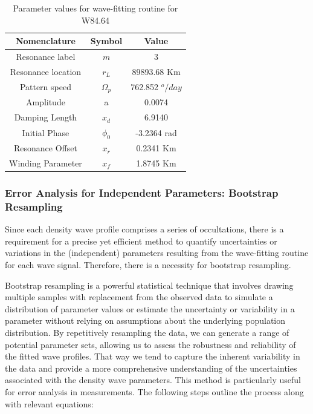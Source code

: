 \documentclass{article}
\begin{document}
\begin{table}
\centering
\begin{tabular}{|c|c|c|}
\hline
\textbf{Nomenclature} & \textbf{Symbol} & \textbf{Value} \\
\hline
Resonance label & $m$ & 3 \\
\hline
Resonance location & $r_{L}$ & 89893.68 Km \\
\hline
Pattern speed & $\Omega_{p}$ & 762.852 $^{o}/day$ \\
\hline
Amplitude & a & 0.0074 \\
\hline
Damping Length & $x_{d}$ & 6.9140 \\
\hline
Initial Phase & $\phi_{0}$ & -3.2364 rad \\
\hline
Resonance Offset & $x_{r}$ & 0.2341 Km \\
\hline
Winding Parameter & $x_{f}$ & 1.8745 Km \\
\hline
\end{tabular}
\caption{Parameter values for wave-fitting routine for W84.64}
\end{table}







\subsubsection{Error Analysis for Independent Parameters: Bootstrap Resampling}

Since each density wave profile comprises a series of occultations, there is a requirement for a precise yet efficient method to quantify uncertainties or variations in the (independent) parameters resulting from the wave-fitting routine for each wave signal. Therefore, there is a necessity for bootstrap resampling.

Bootstrap resampling is a powerful statistical technique that involves drawing multiple samples with replacement from the observed data to simulate a distribution of parameter values or estimate the uncertainty or variability in a parameter without relying on assumptions about the underlying population distribution\cite{Chernick2007BootstrapMA}\cite{davison_hinkley_1997}. By repetitively resampling the data, we can generate a range of potential parameter sets, allowing us to assess the robustness and reliability of the fitted wave profiles. That way we tend to capture the inherent variability in the data and provide a more comprehensive understanding of the uncertainties associated with the density wave parameters\cite{Efron1994AnIT}\cite{article}. This method is particularly useful for error analysis in measurements. The following steps outline the process along with relevant equations:
\end{document}
